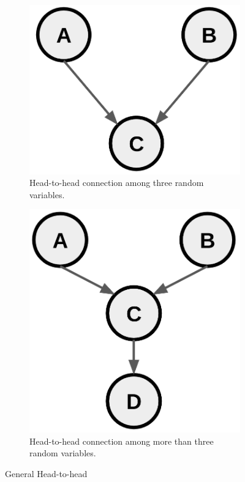 \begin{figure}[H]
	\centering
	\begin{subfigure}
		[t]{0.49\textwidth}
		\centering
		\includegraphics[width=\textwidth]{
			images/08_BayesianNetworks_generalHeadToHead1.png
		}
		\caption{Head-to-head connection among three random variables.}
		\label{fig:generalHeadToHead1}
	\end{subfigure}
	\hfill
	\begin{subfigure}
		[t]{0.49\textwidth}
		\centering
		\includegraphics[width=\linewidth]{
			images/08_BayesianNetworks_generalHeadToHead2.png
		}
		\caption{Head-to-head connection among more than three random variables.}
		\label{fig:generalHeadToHead2}
	\end{subfigure}

	\caption{General Head-to-head}
	\label{fig:generalHeadToHead}
\end{figure}

